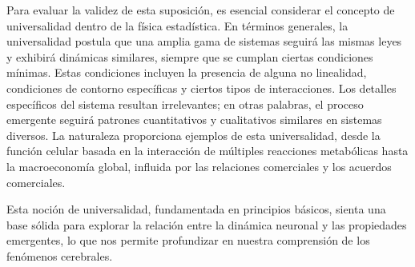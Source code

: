  
 Para evaluar la validez de esta suposición, es esencial considerar el concepto de universalidad dentro de la física estadística. En términos generales, la universalidad postula que una amplia gama de sistemas seguirá las mismas leyes y exhibirá dinámicas similares, siempre que se cumplan ciertas condiciones mínimas. Estas condiciones incluyen la presencia de alguna no linealidad, condiciones de contorno específicas y ciertos tipos de interacciones. Los detalles específicos del sistema resultan irrelevantes; en otras palabras, el proceso emergente seguirá patrones cuantitativos y cualitativos similares en sistemas diversos. La naturaleza proporciona ejemplos de esta universalidad, desde la función celular basada en la interacción de múltiples reacciones metabólicas hasta la macroeconomía global, influida por las relaciones comerciales y los acuerdos comerciales.
 
 Esta noción de universalidad, fundamentada en principios básicos, sienta una base sólida para explorar la relación entre la dinámica neuronal y las propiedades emergentes, lo que nos permite profundizar en nuestra comprensión de los fenómenos cerebrales.
 
 
 
